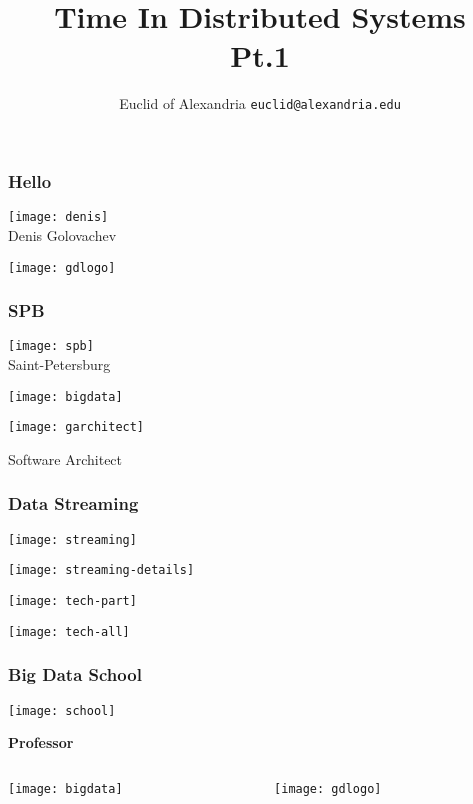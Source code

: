 \documentclass[aspectratio=169, 15pt,usenames,dvipsnames]{beamer}
\title{Time In Distributed Systems\\Pt.1}
\author[Euclid]{Euclid of Alexandria \texttt{euclid@alexandria.edu}}
\begin{document}
   
	\begin{titlePage} 
		\titlepage        
	\end{titlePage}
		
	\begin{gdblank}
		\frametitle{Hello}
		\centering\texttt{[image: denis]}
		\\Denis Golovachev
	\end{gdblank} 
	\begin{gdblank}
		\centering\texttt{[image: gdlogo]}
	\end{gdblank}
	\begin{gdblank}
		\frametitle{SPB}
		\centering\texttt{[image: spb]}
		\\Saint-Petersburg
	\end{gdblank}
	\begin{gdblank}
		\centering\texttt{[image: bigdata]} 
	\end{gdblank}
	\begin{gdblank}
		\centering\texttt{[image: garchitect]} 
		\par\LARGE
		Software Architect
	\end{gdblank}
	\begin{gdblank}
		\frametitle{Data Streaming}
		\centering\texttt{[image: streaming]} 
	\end{gdblank}
	\begin{gdblank}
		\centering\texttt{[image: streaming-details]} 
	\end{gdblank}
	\begin{gdblank}
		\centering\texttt{[image: tech-part]} 
	\end{gdblank}
	\begin{gdblank}
		\centering\texttt{[image: tech-all]} 
	\end{gdblank}
	\begin{gdblank}
		\frametitle{Big Data School}
		\centering\texttt{[image: school]}
		\par\LARGE
		\pause
		\textbf{
			Professor
		}		
	\end{gdblank}
	\begin{gdblank}
		\centering{\fontsize{100pt}{120pt}\selectfont\bf Boring}
	\end{gdblank}   
	\begin{gdblank}
		\begin{columns}
			\begin{column}{0.5\textwidth}
				\centering\texttt{[image: bigdata]}
			\end{column}
			\pause 
			\begin{column}{0.5\textwidth}
				\centering\texttt{[image: gdlogo]}
			\end{column}
		\end{columns}        
	\end{gdblank}
\end{document}
